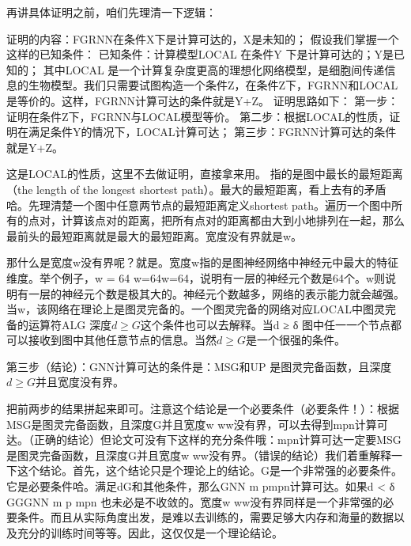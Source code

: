 
再讲具体证明之前，咱们先理清一下逻辑：

证明的内容：FGRNN在条件X下是计算可达的，X是未知的；
假设我们掌握一个这样的已知条件：
已知条件：计算模型LOCAL 在条件Y 下是计算可达的；Y是已知的；
其中LOCAL 是一个计算复杂度更高的理想化网络模型，是细胞间传递信息的生物模型。我们只需要试图构造一个条件Z，在条件Z下，FGRNN和LOCAL是等价的。这样，FGRNN计算可达的条件就是Y+Z。
证明思路如下：
第一步：证明在条件Z下，FGRNN与LOCAL模型等价。
第二步：根据LOCAL的性质，证明在满足条件Y的情况下，LOCAL计算可达；
第三步：FGRNN计算可达的条件就是Y+Z。
 

 这是LOCAL的性质，这里不去做证明，直接拿来用。 ​
  指的是图中最长的最短距离（the length of the longest shortest path）。最大的最短距离，看上去有的矛盾哈。先理清楚一个图中任意两节点的最短距离定义shortest path。遍历一个图中所有的点对，计算该点对的距离，把所有点对的距离都由大到小地排列在一起，那么最前头的最短距离就是最大的最短距离。宽度没有界就是w。
 
 那什么是宽度w没有界呢？就是。宽度w指的是图神经网络中神经元中最大的特征维度。举个例子，w = 64 w=64w=64，说明有一层的神经元个数是64个。w则说明有一层的神经元个数是极其大的。神经元个数越多，网络的表示能力就会越强。当w，该网络在理论上是图灵完备的。一个图灵完备的网络对应LOCAL中图灵完备的运算符ALG 
 深度$d\geq G$​这个条件也可以去解释。当d ≥ δ 图中任一一个节点都可以接收到图中其他任意节点的信息。当然$d\geq G$是一个很强的条件。​
 
 第三步（结论）：GNN计算可达的条件是：MSG和UP 是图灵完备函数，且深度$d\geq G$​并且宽度没有界。
 
 把前两步的结果拼起来即可。注意这个结论是一个必要条件（必要条件！）：根据MSG是图灵完备函数，且深度G并且宽度w ww没有界，可以去得到mpn计算可达。（正确的结论）但论文可没有下这样的充分条件哦：mpn计算可达一定要MSG是图灵完备函数，且深度G并且宽度w ww没有界。（错误的结论）我们着重解释一下这个结论。首先，这个结论只是个理论上的结论。G是一个非常强的必要条件。它是必要条件哈。满足dG和其他条件，那么GNN m pmpn计算可达。如果d < δ GGGNN m p mpn
也未必是不收敛的。宽度w ww没有界同样是一个非常强的必要条件。而且从实际角度出发，是难以去训练的，需要足够大内存和海量的数据以及充分的训练时间等等。因此，这仅仅是一个理论结论。


